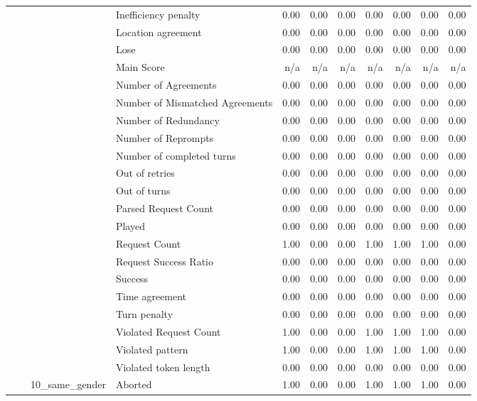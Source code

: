 \begin{tabular}{llllrrrrrrr}
 &  &  & Inefficiency penalty & 0.00 & 0.00 & 0.00 & 0.00 & 0.00 & 0.00 & 0.00 \\
 &  &  & Location agreement & 0.00 & 0.00 & 0.00 & 0.00 & 0.00 & 0.00 & 0.00 \\
 &  &  & Lose & 0.00 & 0.00 & 0.00 & 0.00 & 0.00 & 0.00 & 0.00 \\
 &  &  & Main Score & n/a & n/a & n/a & n/a & n/a & n/a & n/a \\
 &  &  & Number of Agreements & 0.00 & 0.00 & 0.00 & 0.00 & 0.00 & 0.00 & 0.00 \\
 &  &  & Number of Mismatched Agreements & 0.00 & 0.00 & 0.00 & 0.00 & 0.00 & 0.00 & 0.00 \\
 &  &  & Number of Redundancy & 0.00 & 0.00 & 0.00 & 0.00 & 0.00 & 0.00 & 0.00 \\
 &  &  & Number of Reprompts & 0.00 & 0.00 & 0.00 & 0.00 & 0.00 & 0.00 & 0.00 \\
 &  &  & Number of completed turns & 0.00 & 0.00 & 0.00 & 0.00 & 0.00 & 0.00 & 0.00 \\
 &  &  & Out of retries & 0.00 & 0.00 & 0.00 & 0.00 & 0.00 & 0.00 & 0.00 \\
 &  &  & Out of turns & 0.00 & 0.00 & 0.00 & 0.00 & 0.00 & 0.00 & 0.00 \\
 &  &  & Parsed Request Count & 0.00 & 0.00 & 0.00 & 0.00 & 0.00 & 0.00 & 0.00 \\
 &  &  & Played & 0.00 & 0.00 & 0.00 & 0.00 & 0.00 & 0.00 & 0.00 \\
 &  &  & Request Count & 1.00 & 0.00 & 0.00 & 1.00 & 1.00 & 1.00 & 0.00 \\
 &  &  & Request Success Ratio & 0.00 & 0.00 & 0.00 & 0.00 & 0.00 & 0.00 & 0.00 \\
 &  &  & Success & 0.00 & 0.00 & 0.00 & 0.00 & 0.00 & 0.00 & 0.00 \\
 &  &  & Time agreement & 0.00 & 0.00 & 0.00 & 0.00 & 0.00 & 0.00 & 0.00 \\
 &  &  & Turn penalty & 0.00 & 0.00 & 0.00 & 0.00 & 0.00 & 0.00 & 0.00 \\
 &  &  & Violated Request Count & 1.00 & 0.00 & 0.00 & 1.00 & 1.00 & 1.00 & 0.00 \\
 &  &  & Violated pattern & 1.00 & 0.00 & 0.00 & 1.00 & 1.00 & 1.00 & 0.00 \\
 &  &  & Violated token length & 0.00 & 0.00 & 0.00 & 0.00 & 0.00 & 0.00 & 0.00 \\
\cline{3-11}
 &  & \multirow[t]{27}{*}{10_same_gender} & Aborted & 1.00 & 0.00 & 0.00 & 1.00 & 1.00 & 1.00 & 0.00 \\

\end{tabular}
